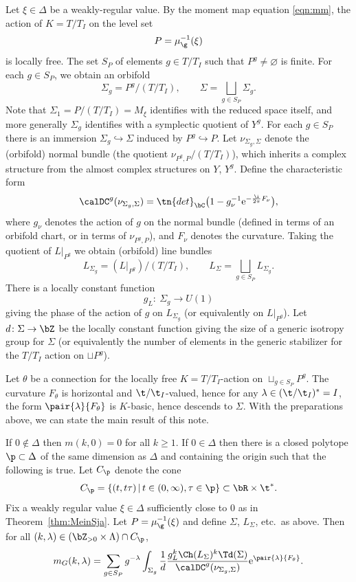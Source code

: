 Let $\xi \in \Delta$ be a weakly-regular value. By the moment map equation \eqref{eqn:mm}, the action of $K=T/T_I$ on the level set
\[ P=\mu_\g^{-1}(\xi) \]
is locally free. The set $S_P$ of elements $g \in T/T_I$ such that $P^g\ne \varnothing$ is finite. For each $g \in S_P$, we obtain an orbifold
\[ \Sigma_g=P^g/(T/T_I), \qquad \Sigma=\bigsqcup_{g \in S_P} \Sigma_g.\]
Note that $\Sigma_1=P/(T/T_I)=M_\xi$ identifies with the reduced space itself, and more generally $\Sigma_g$ identifies with a symplectic quotient of $Y^g$. For each $g \in S_P$ there is an immersion $\Sigma_g\hookrightarrow \Sigma$ induced by $P^g\hookrightarrow P$. Let $\nu_{\Sigma_g,\Sigma}$ denote the (orbifold) normal bundle (the quotient $\nu_{P^g,P}/(T/T_I)$), which inherits a complex structure from the almost complex structures on $Y$, $Y^g$. Define the characteristic form
\[ \calDC^g(\nu_{\Sigma_g,\Sigma})=\tn{det}_\bC\big(1-g_\nu^{-1} {\rm e}^{-\frac{\i}{2\pi}F_\nu}\big), \]
where $g_\nu$ denotes the action of $g$ on the normal bundle (defined in terms of an orbifold chart, or in terms of $\nu_{P^g,P}$), and $F_\nu$ denotes the curvature. Taking the quotient of $L|_{P^g}$ we obtain (orbifold) line bundles
\[ L_{\Sigma_g}=(L|_{P^g})/(T/T_I), \qquad L_\Sigma=\bigsqcup_{g \in S_P} L_{\Sigma_g}. \]
There is a locally constant function
\[ g_L \colon \ \Sigma_g \rightarrow U(1) \]
giving the phase of the action of $g$ on $L_{\Sigma_g}$ (or equivalently on $L|_{P^g}$). Let $d \colon \Sigma \rightarrow \bZ$ be the locally constant function giving the size of a generic isotropy group for $\Sigma$ (or equivalently the number of elements in the generic stabilizer for the $T/T_I$ action on $\sqcup P^g$).

Let $\theta$ be a connection for the locally free $K=T/T_I$-action on $\sqcup_{g \in S_P}P^g$. The curvature $F_\theta$ is horizontal and $\t/\t_I$-valued, hence for any $\lambda \in (\t/\t_I)^\ast=I$, the form $\pair{\lambda}{F_\theta}$ is $K$-basic, hence descends to $\Sigma$. With the preparations above, we can state the main result of this note.
\begin{Theorem}\label{thm:main}If $0 \notin \Delta$ then $m(k,0)=0$ for all $k \ge 1$. If $0 \in \Delta$ then there is a closed polytope $\p \subset \Delta$ of the same dimension as $\Delta$ and containing the origin such that the following is true. Let $C_\p$ denote the cone
\[ C_\p=\{(t,t\tau)\,|\,t \in (0,\infty), \tau \in \p \} \subset \bR \times \t^\ast.\]
Fix a weakly regular value $\xi \in \Delta$ sufficiently close to $0$ as in Theorem~{\rm \ref{thm:MeinSja}}. Let $P=\mu_\g^{-1}(\xi)$ and define $\Sigma$, $L_\Sigma$, etc.\ as above. Then for all $(k,\lambda) \in (\bZ_{>0}\times \Lambda)\cap C_\p$,
\begin{gather}\label{eqn:main}
m_G(k,\lambda)=\sum_{g \in S_P} g^{-\lambda} \int_{\Sigma_g} \frac{1}{d}\frac{g_L^k\Ch(L_\Sigma)^k\Td(\Sigma)}{\calDC^g(\nu_{\Sigma_g,\Sigma})}{\rm e}^{\pair{\lambda}{F_\theta}}.
\end{gather}
\end{Theorem}
